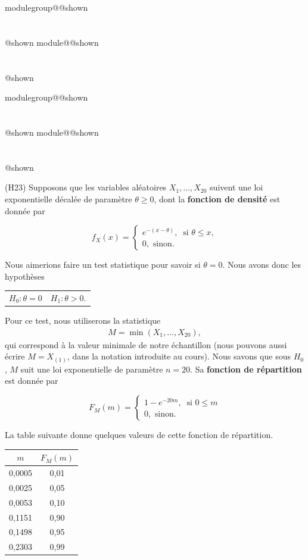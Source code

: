 \documentclass{Evaluation}
\makeatletter
\newcommand{\currentmodulekey}{}
\newcommand{\currentmoduletitle}{}
\newcommand{\currentgroupkey}{}
\newcommand{\currentgrouptitle}{}
\newcommand{\showmoduleifneeded}{%
  \ifx\currentgroupkey\empty\else
    \expandafter\ifx\csname modulegroup@\currentgroupkey @shown\endcsname\relax
      \section*{\currentgrouptitle}%
      \expandafter\gdef\csname modulegroup@\currentgroupkey @shown\endcsname{1}%
    \fi
  \fi
  \expandafter\ifx\csname module@\currentmodulekey @shown\endcsname\relax
    \section*{\currentmoduletitle}%
    \expandafter\gdef\csname module@\currentmodulekey @shown\endcsname{1}%
  \fi
}
\newenvironment{H23}{\showmoduleifneeded}{}
\makeatother
\begin{document}
\begin{questions}
\begin{H23}
\end{H23}

\begin{H23}
\question
(H23) Supposons que les variables aléatoires $X_1,...,X_{20}$ suivent une loi exponentielle décalée de paramètre $\theta \geq0 $, dont la \textbf{fonction de densité} est donnée par 

 \begin{equation*}
  f_X(x) = \begin{cases}
         e^{-(x-\theta)},\ \text{  si  } \theta \leq x , \\
        0, \text{ sinon.}
        \end{cases}
 \end{equation*}

Nous aimerions faire un test statistique pour savoir si $\theta=0$. Nous avons donc les hypothèses

\begin{table}[ht]
    \centering
    \begin{tabular}{cc}
         $H_0: \theta=0$ & $H_1: \theta > 0$.
    \end{tabular}
\end{table}
Pour ce test, nous utiliserons la statistique
\begin{align*}
    M=\min (X_1,...,X_{20}),
\end{align*}
qui correspond à la valeur minimale de notre échantillon (nous pouvons aussi écrire $M=X_{(1)}$, dans la notation introduite au cours).
Nous savons que sous $H_0$, $M$ suit une loi exponentielle de paramètre $n=20$. Sa \textbf{fonction de répartition} est donnée par 

 \begin{equation*}
  F_M(m) = \begin{cases}
         1-e^{-20m},\ \text{  si  } 0\leq m \\
        0, \text{ sinon.}
        \end{cases}
 \end{equation*}

La table suivante donne quelques valeurs de cette fonction de répartition.
\begin{table}[ht]
    \centering
\begin{tabular}{|cc|}
  \hline
 $m$ & $F_M(m)$ \\ 
  \hline
    0,0005 & 0,01 \\
    0,0025 & 0,05 \\
    0,0053 & 0,10 \\
    0,1151 & 0,90 \\
    0,1498 & 0,95 \\ 
    0,2303 & 0,99 \\ 
  \hline
\end{tabular}
\end{table}


\end{H23}
\end{questions}
\end{document}
